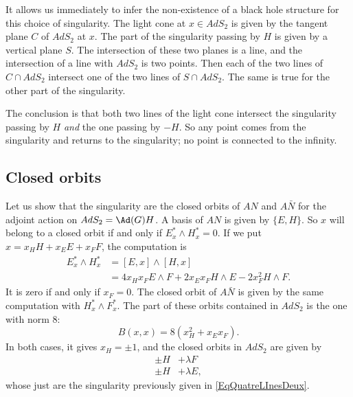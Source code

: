 It allows us immediately to infer the non-existence of a black hole structure for this choice of singularity. The light cone at $x\in AdS_2$ is given by the tangent plane $C$ of $AdS_2$ at $x$. The part of the singularity passing by $H$ is given by a vertical plane $S$. The intersection of these two planes is a line, and the intersection of a line with $AdS_2$ is two points. Then each of the two lines of $C\cap AdS_2$ intersect one of the two lines of $S\cap AdS_2$. The same is true for the other part of the singularity.


The conclusion is that both two lines of the light cone intersect the singularity passing by $H$ \emph{and} the one passing by $-H$.  So any point comes from the singularity and returns to the singularity; no point is connected to the infinity.


\subsection{Closed orbits}

Let us show that the singularity are the closed orbits of $AN$
and $A\bar{N}$ for the adjoint action on $AdS_2=\Ad(G)H$. A basis of $AN$
is given by $\{E,H\}$. So $x$ will belong to a closed orbit if and only if
$E_x^*\wedge H^*_x=0$. If we put $x=x_HH+x_EE+x_FF$, the computation is
\begin{equation}
\begin{split}
E_x^*\wedge H^*_x&=[E,x]\wedge[H,x]\\
                 &=4x_Hx_F E\wedge F+2x_Ex_F H\wedge E-2x_F^2 H\wedge F.
\end{split}
\end{equation}
It is zero if and only if $x_F=0$. The closed orbit of $A\bar{N}$ is given by the same computation with $H^*_x\wedge F^*_x$. The part of these orbits contained in $AdS_2$ is the one with norm $8$:
\begin{equation}
B(x,x)=8(x_H^2+x_Ex_F).
\end{equation}
In both cases, it gives $x_H=\pm 1$, and the closed orbits in $AdS_2$ are given by
\begin{subequations}
\begin{align}
\pm H&+\lambda F\\
\pm H&+\lambda E,
\end{align}
\end{subequations}
whose just are the singularity previously given in \eqref{EqQuatreLInesDeux}.


